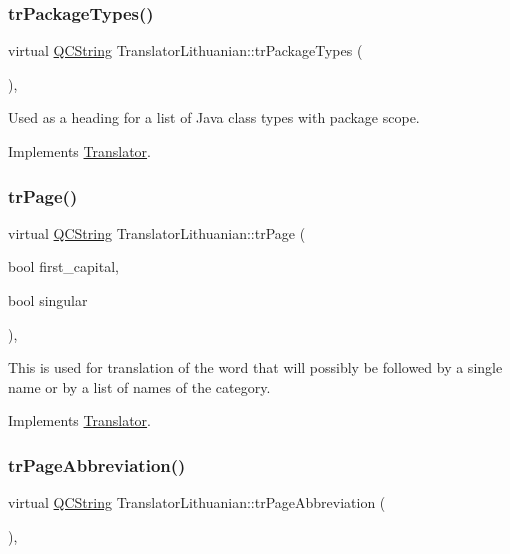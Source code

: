 \subsubsection{\texorpdfstring{trPackageTypes()}{trPackageTypes()}}
{\footnotesize\ttfamily virtual \mbox{\hyperlink{class_q_c_string}{Q\+C\+String}} Translator\+Lithuanian\+::tr\+Package\+Types (\begin{DoxyParamCaption}{ }\end{DoxyParamCaption})\hspace{0.3cm}{\ttfamily [inline]}, {\ttfamily [virtual]}}

Used as a heading for a list of Java class types with package scope. 

Implements \mbox{\hyperlink{class_translator}{Translator}}.

\mbox{\label{class_translator_lithuanian_ad138873083d072df0d1b7e0e96e37f55}} 
\subsubsection{\texorpdfstring{trPage()}{trPage()}}
{\footnotesize\ttfamily virtual \mbox{\hyperlink{class_q_c_string}{Q\+C\+String}} Translator\+Lithuanian\+::tr\+Page (\begin{DoxyParamCaption}\item[{bool}]{first\+\_\+capital,  }\item[{bool}]{singular }\end{DoxyParamCaption})\hspace{0.3cm}{\ttfamily [inline]}, {\ttfamily [virtual]}}

This is used for translation of the word that will possibly be followed by a single name or by a list of names of the category. 

Implements \mbox{\hyperlink{class_translator}{Translator}}.

\mbox{\label{class_translator_lithuanian_a3a940853a4c23b6deba741b3e35de652}} 
\subsubsection{\texorpdfstring{trPageAbbreviation()}{trPageAbbreviation()}}
{\footnotesize\ttfamily virtual \mbox{\hyperlink{class_q_c_string}{Q\+C\+String}} Translator\+Lithuanian\+::tr\+Page\+Abbreviation (\begin{DoxyParamCaption}{ }\end{DoxyParamCaption})\hspace{0.3cm}{\ttfamily [inline]}, {\ttfamily [virtual]}}

